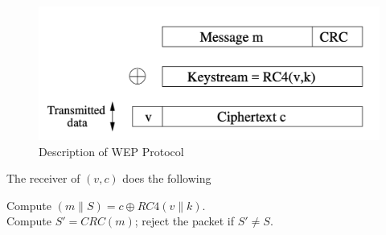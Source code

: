 \documentclass[12pt,titlepage]{article}
\begin{document}
\begin{center}
	\begin{figure}[h!]
		\includegraphics[width=\textwidth]{WEP_Protocol.png}
		\caption{Description of WEP Protocol}
	\end{figure}
\end{center}

\begin{algorithm}
	\caption{The receiver of $(v, c)$ does the following}
	Compute $(m \| S) = c \oplus RC4(v \| k)$.\\
	Compute $S' = CRC(m)$; reject the packet if $S' \neq S$.
\end{algorithm}
\end{document}
